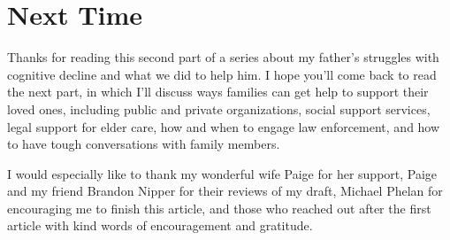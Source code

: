 \documentclass{article}
\begin{document}
\section*{Next Time}

Thanks for reading this second part of a series about my father’s struggles with cognitive decline and what we did to help him. I hope you’ll come back to read the next part, in which I'll discuss ways families can get help to support their loved ones, including public and private organizations, social support services, legal support for elder care, how and when to engage law enforcement, and how to have tough conversations with family members.

I would especially like to thank my wonderful wife Paige for her support, Paige and my friend Brandon Nipper for their reviews of my draft, Michael Phelan for encouraging me to finish this article, and those who reached out after the first article with kind words of encouragement and gratitude. 
\end{document}
